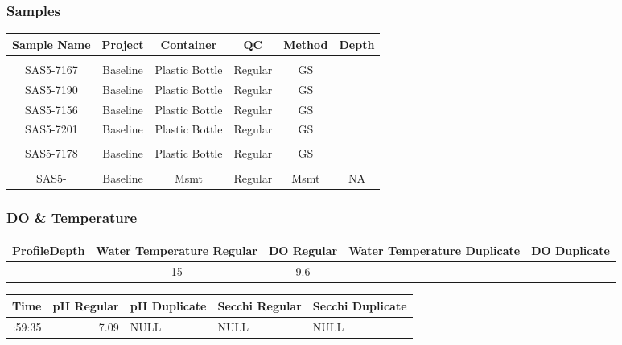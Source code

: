 \documentclass[
  letterpaper,
  DIV=11,
  numbers=noendperiod]{scrartcl}
\begin{document}
\subsubsection{Samples}

\begin{longtable*}{cccccc}
\toprule
Sample Name & Project & Container & QC & Method & Depth \\ 
\midrule\addlinespace[2.5pt]
 \\ 
\midrule\addlinespace[2.5pt]
SAS5-7167 & Baseline & Plastic Bottle & Regular & GS &  \\ 
SAS5-7190 & Baseline & Plastic Bottle & Regular & GS &  \\ 
SAS5-7156 & Baseline & Plastic Bottle & Regular & GS &  \\ 
SAS5-7201 & Baseline & Plastic Bottle & Regular & GS &  \\ 
\midrule\addlinespace[2.5pt]
 \\ 
\midrule\addlinespace[2.5pt]
SAS5-7178 & Baseline & Plastic Bottle & Regular & GS &  \\ 
\midrule\addlinespace[2.5pt]
 \\ 
\midrule\addlinespace[2.5pt]
SAS5- & Baseline & Msmt & Regular & Msmt & NA \\ 
\bottomrule
\end{longtable*}

\subsubsection{DO \& Temperature}

\begin{longtable*}{rcccc}
\toprule
ProfileDepth & Water Temperature Regular & DO Regular & Water Temperature Duplicate & DO Duplicate \\ 
\midrule{} & 15 & 9.6 &  &  \\ 
\bottomrule
\end{longtable*}

\begin{longtable*}{rrlll}
\toprule
Time & pH Regular & pH Duplicate & Secchi Regular & Secchi Duplicate \\ 
\midrule{}:59:35 & 7.09 & NULL & NULL & NULL \\ 
\bottomrule
\end{longtable*}
\end{document}
